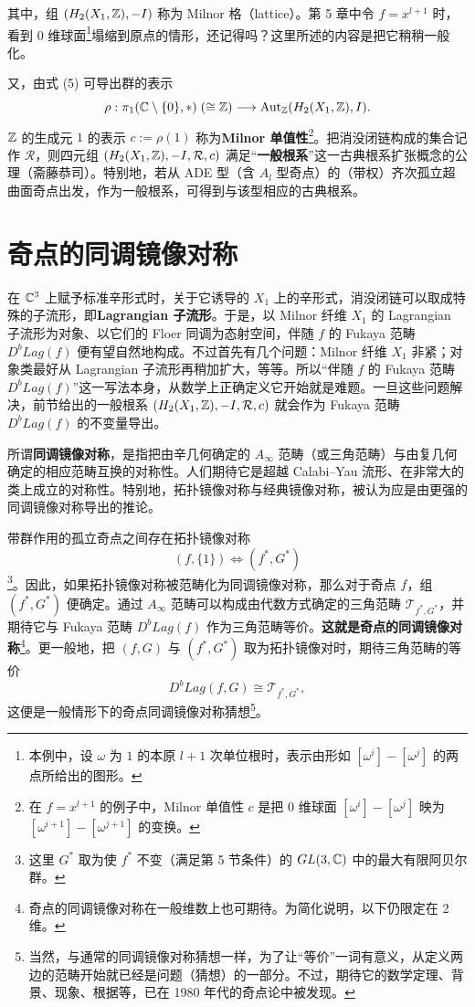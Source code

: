 其中，组 $(H_2(X_1,\mathbb{Z}),-I)$ 称为 Milnor 格（lattice）。第 5 章中令 $f=x^{l+1}$ 时，看到 0 维球面\footnote{本例中，设 $\omega$ 为 $1$ 的本原 $l+1$ 次单位根时，表示由形如 $[\omega^i]-[\omega^j]$ 的两点所给出的图形。}塌缩到原点的情形，还记得吗？这里所述的内容是把它稍稍一般化。%

又，由式 (5) 可导出群的表示
%
\[
  \rho:\pi_1(\mathbb{C}\setminus\{0\},*)\;(\cong\mathbb{Z})\longrightarrow
  \mathrm{Aut}_{\mathbb{Z}}(H_2(X_1,\mathbb{Z}),I).
\]
%
$\mathbb{Z}$ 的生成元 $1$ 的表示 $c:=\rho(1)$ 称为\textbf{Milnor 单值性}\footnote{在 $f=x^{l+1}$ 的例子中，Milnor 单值性 $c$ 是把 0 维球面 $[\omega^i]-[\omega^j]$ 映为 $[\omega^{i+1}]-[\omega^{j+1}]$ 的变换。}。把消没闭链构成的集合记作 $\mathcal{R}$，则四元组 $(H_2(X_1,\mathbb{Z}),-I,\mathcal{R},c)$ 满足“\textbf{一般根系}”这一古典根系扩张概念的公理（斋藤恭司）。特别地，若从 ADE 型（含 $A_l$ 型奇点）的（带权）齐次孤立超曲面奇点出发，作为一般根系，可得到与该型相应的古典根系。

\section{奇点的同调镜像对称}

在 $\mathbb{C}^3$ 上赋予标准辛形式时，关于它诱导的 $X_1$ 上的辛形式，消没闭链可以取成特殊的子流形，即\textbf{Lagrangian 子流形}。于是，以 Milnor 纤维 $X_1$ 的 Lagrangian 子流形为对象、以它们的 Floer 同调为态射空间，伴随 $f$ 的 Fukaya 范畴 $D^bLag(f)$ 便有望自然地构成。不过首先有几个问题：Milnor 纤维 $X_1$ 非紧；对象类最好从 Lagrangian 子流形再稍加扩大，等等。所以“伴随 $f$ 的 Fukaya 范畴 $D^bLag(f)$”这一写法本身，从数学上正确定义它开始就是难题。一旦这些问题解决，前节给出的一般根系 $(H_2(X_1,\mathbb{Z}),-I,\mathcal{R},c)$ 就会作为 Fukaya 范畴 $D^bLag(f)$ 的不变量导出。

所谓\textbf{同调镜像对称}，是指把由辛几何确定的 $A_\infty$ 范畴（或三角范畴）与由复几何确定的相应范畴互换的对称性。人们期待它是超越 Calabi--Yau 流形、在非常大的类上成立的对称性。特别地，拓扑镜像对称与经典镜像对称，被认为应是由更强的同调镜像对称导出的推论。

带群作用的孤立奇点之间存在拓扑镜像对称
%
\[
  (f,\{1\})\Longleftrightarrow(f^*,G^*)
\]
%
\footnote{这里 $G^*$ 取为使 $f^*$ 不变（满足第 5 节条件）的 $GL(3,\mathbb{C})$ 中的最大有限阿贝尔群。}。因此，如果拓扑镜像对称被范畴化为同调镜像对称，那么对于奇点 $f$，组 $(f^*,G^*)$ 便确定。通过 $A_\infty$ 范畴可以构成由代数方式确定的三角范畴 $\mathcal{T}_{f^*,G^*}$，并期待它与 Fukaya 范畴 $D^bLag(f)$ 作为三角范畴等价。\textbf{这就是奇点的同调镜像对称}\footnote{奇点的同调镜像对称在一般维数上也可期待。为简化说明，以下仍限定在 2 维。}。更一般地，把 $(f,G)$ 与 $(f^*,G^*)$ 取为拓扑镜像对时，期待三角范畴的等价
%
\[
  D^bLag(f,G)\cong\mathcal{T}_{f^*,G^*},
\]
%
这便是一般情形下的奇点同调镜像对称猜想\footnote{当然，与通常的同调镜像对称猜想一样，为了让“等价”一词有意义，从定义两边的范畴开始就已经是问题（猜想）的一部分。不过，期待它的数学定理、背景、现象、根据等，已在 1980 年代的奇点论中被发现。}。

